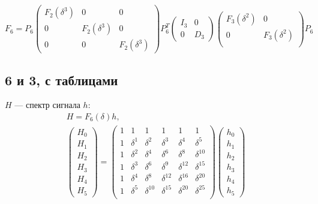 \[
    F_6
    = P_6
    \begin{pmatrix}
        F_2(\delta^3) & 0             & 0             \\
        0             & F_2(\delta^3) & 0             \\
        0             & 0             & F_2(\delta^3)
    \end{pmatrix}
    P_6^T
    \begin{pmatrix}
        I_3 & 0   \\
        0   & D_3
    \end{pmatrix}
    \begin{pmatrix}
        F_3(\delta^2) & 0             \\
        0             & F_3(\delta^2) \\
    \end{pmatrix}
    P_6
\]

\subsection{6 и 3, с таблицами}

$H$ --- спектр сигнала $h$:
\begin{gather*}
    H = F_6(\delta) h , \\
    \begin{pmatrix}
        H_0 \\
        H_1 \\
        H_2 \\
        H_3 \\
        H_4 \\
        H_5
    \end{pmatrix}
    = \begin{pmatrix}
          1 & 1        & 1           & 1           & 1           & 1           \\
          1 & \delta^1 & \delta^2    & \delta^3    & \delta^4    & \delta^5    \\
          1 & \delta^2 & \delta^4    & \delta^6    & \delta^8    & \delta^{10} \\
          1 & \delta^3 & \delta^6    & \delta^9    & \delta^{12} & \delta^{15} \\
          1 & \delta^4 & \delta^8    & \delta^{12} & \delta^{16} & \delta^{20} \\
          1 & \delta^5 & \delta^{10} & \delta^{15} & \delta^{20} & \delta^{25} \\
    \end{pmatrix}
    \begin{pmatrix}
        h_0 \\
        h_1 \\
        h_2 \\
        h_3 \\
        h_4 \\
        h_5
    \end{pmatrix}
\end{gather*}

